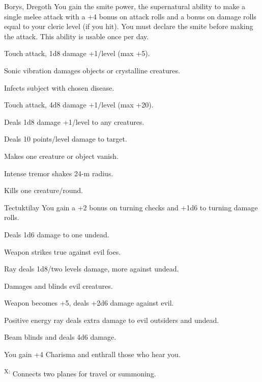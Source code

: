 {Borys, Dregoth}
{You gain the smite power, the supernatural ability to make a single melee attack with a +4 bonus on attack rolls and a bonus on damage rolls equal to your cleric level (if you hit). You must declare the smite before making the attack. This ability is usable once per day.}
{
	\item {} Touch attack, 1d8 damage +1/level (max +5).
	\item {} Sonic vibration damages objects or crystalline creatures.
	\item {} Infects subject with chosen disease.
	\item {} Touch attack, 4d8 damage +1/level (max +20).
	\item {} Deals 1d8 damage +1/level to any creatures.
	\item {} Deals 10 points/level damage to target.
	\item {} Makes one creature or object vanish.
	\item {} Intense tremor shakes 24-m radius.
	\item {} Kills one creature/round.
}

{Tectuktilay}
{You gain a +2 bonus on turning checks and +1d6 to turning damage rolls.}
{
	\item {} Deals 1d6 damage to one undead.
	\item {} Weapon strikes true against evil foes.
	\item {} Ray deals 1d8/two levels damage, more against undead.
	\item {} Damages and blinds evil creatures.
	\item {} Weapon becomes +5, deals +2d6 damage against evil.
	\item {} Positive energy ray deals extra damage to evil outsiders and undead.
	\item {} Beam blinds and deals 4d6 damage.
	\item {} You gain +4 Charisma and enthrall those who hear you.
	\item {}\textsuperscript{X:} Connects two planes for travel or summoning.
}

